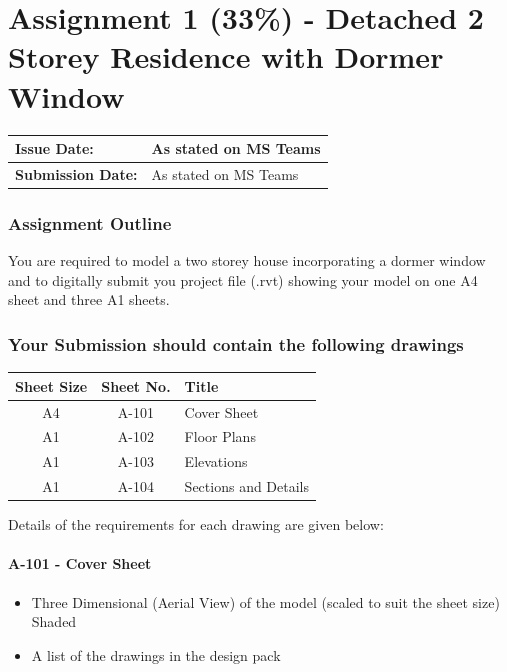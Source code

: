 
	
\part*{Assignment 1 (33\%) - Detached 2 Storey Residence with Dormer Window}

\begin{tabularx}{\textwidth}{ |X|X| }
	\hline
	\textbf{Issue Date:} & As stated on MS Teams \\
	\hline 
	\textbf{Submission Date:}  & As stated on MS Teams \\
	\hline
\end{tabularx}


\section*{Assignment Outline}


You are required to model a two storey house incorporating a dormer window and to digitally submit you project file (.rvt) showing your model on one A4 sheet and three A1 sheets.


\section*{Your Submission should contain the following drawings}



\begin{tabularx}{\textwidth}{ |c|c|X| }
	\hline
	\textbf{Sheet Size} & \textbf{Sheet No.} & \textbf{Title} \\
	\hline 
	A4  & A-101 & Cover Sheet \\
	A1  & A-102 & Floor Plans \\
	A1  & A-103 & Elevations \\
	A1  & A-104 & Sections and Details \\
	\hline
\end{tabularx}

Details of the requirements for each drawing are given below:\\

\subsection*{A-101 - Cover Sheet}
\begin{itemize}
	\item Three Dimensional (Aerial View) of the model (scaled to suit the sheet size) Shaded
	\item A list of the drawings in the design pack
\end{itemize}


